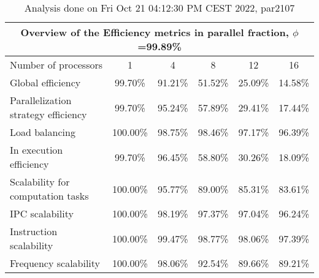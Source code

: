 \begin{table}[h]
\begin{center}
\begin{tabular}{|l|c|c|c|c|c|}
\hline
\multicolumn{6}{|c|}{Overview of the Efficiency metrics in parallel fraction, $\phi$=99.89\%} \\
\hline
\hline
Number of processors & 1 & 4 & 8 & 12 & 16 \\
\hline
\hline
Global efficiency                      &     99.70\% &     91.21\% &     51.52\% &     25.09\% &     14.58\% \\
\hline
\hline
Parallelization strategy efficiency &     99.70\% &     95.24\% &     57.89\% &     29.41\% &     17.44\% \\
\hline
Load balancing                   &    100.00\% &     98.75\% &     98.46\% &     97.17\% &     96.39\% \\
In execution efficiency          &     99.70\% &     96.45\% &     58.80\% &     30.26\% &     18.09\% \\
\hline
\hline
Scalability for computation tasks   &    100.00\% &     95.77\% &     89.00\% &     85.31\% &     83.61\% \\
\hline
IPC scalability                  &    100.00\% &     98.19\% &     97.37\% &     97.04\% &     96.24\% \\
Instruction scalability          &    100.00\% &     99.47\% &     98.77\% &     98.06\% &     97.39\% \\
Frequency scalability            &    100.00\% &     98.06\% &     92.54\% &     89.66\% &     89.21\% \\
\hline
\end{tabular}
\end{center}
\caption{ Analysis done on Fri Oct 21 04:12:30 PM CEST 2022, par2107}
\end{table}
